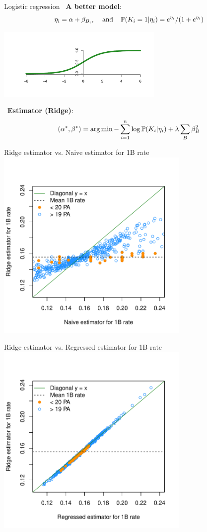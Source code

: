 \documentclass{beamer}
\begin{document}
\begin{frame}{Logistic regression}
~{\bf A better model}:
$$\eta_i = \alpha + \beta_{B_i}, \hspace{4mm}\mbox{and}\hspace{4mm}
\mathbb P(K_i = 1|\eta_i) = e^{\eta_i}/(1+e^{\eta_i})$$
\begin{center}
\includegraphics[width = 0.6\textwidth]{../figs/logistic.pdf}
\end{center}
~{\bf Estimator (Ridge)}:
$$(\alpha^*, \beta^*) = \arg\min-\sum_{i=1}^n\log\mathbb P(K_i|\eta_i) +
    \lambda\sum_B\beta_B^2$$
\end{frame}

\begin{frame}{Ridge estimator vs. Naive estimator for 1B rate}
\centering
\includegraphics[width = 0.7\textwidth]{../figs/regul-as-regre-b.pdf}
\end{frame}

\begin{frame}{Ridge estimator vs. Regressed estimator for 1B rate}
\centering
\includegraphics[width = 0.7\textwidth]{../figs/regul-as-regre-c.pdf}
\end{frame}
\end{document}
